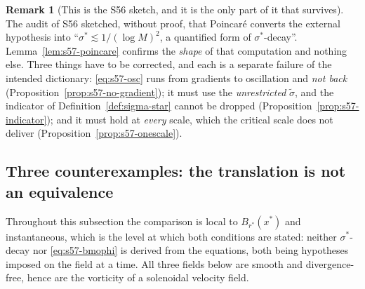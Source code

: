 \documentclass[11pt]{article}
\theoremstyle{definition}
\newtheorem{remark}[theorem]{Remark}
\theoremstyle{remark}
\begin{document}
\begin{remark}[This is the S56 sketch, and it is the only part of it that
  survives]\label{rem:s57-sketch}
  The audit of S56 sketched, without proof, that Poincar\'e converts the
  external hypothesis into ``$\sigma^*\lesssim1/(\log M)^2$, a quantified form
  of $\sigma^*$-decay''. Lemma~\ref{lem:s57-poincare} confirms the
  \emph{shape} of that computation and nothing else. Three things have to be
  corrected, and each is a separate failure of the intended dictionary:
  \eqref{eq:s57-osc} runs from gradients to oscillation and \emph{not back}
  (Proposition~\ref{prop:s57-no-gradient}); it must use the
  \emph{unrestricted} $\tilde\sigma$, and the indicator of
  Definition~\ref{def:sigma-star} cannot be dropped
  (Proposition~\ref{prop:s57-indicator}); and it must hold at \emph{every}
  scale, which the critical scale does not deliver
  (Proposition~\ref{prop:s57-onescale}).
\end{remark}

\subsection{Three counterexamples: the translation is not an equivalence}
\label{subsec:s57-counter}

Throughout this subsection the comparison is local to $B_{r^*}(x^*)$ and
instantaneous, which is the level at which both conditions are stated: neither
$\sigma^*$-decay nor \eqref{eq:s57-bmophi} is derived from the equations, both
being hypotheses imposed on the field at a time. All three fields below are
smooth and divergence-free, hence are the vorticity of a solenoidal velocity
field.
\end{document}

